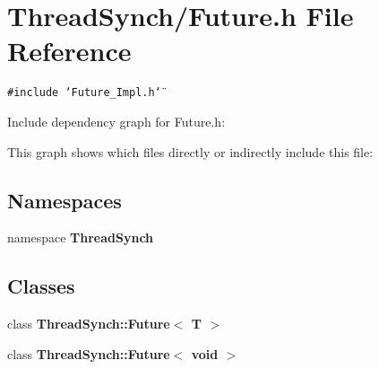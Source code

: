 \section{Thread\-Synch/Future.h File Reference}
\label{_future_8h}
{\tt \#include \char`\"{}Future\_\-Impl.h\char`\"{}}\par


Include dependency graph for Future.h:

This graph shows which files directly or indirectly include this file:\subsection*{Namespaces}
\begin{CompactItemize}
\item 
namespace {\bf Thread\-Synch}
\end{CompactItemize}
\subsection*{Classes}
\begin{CompactItemize}
\item 
class {\bf Thread\-Synch::Future$<$ T $>$}
\item 
class {\bf Thread\-Synch::Future$<$ void $>$}
\end{CompactItemize}
